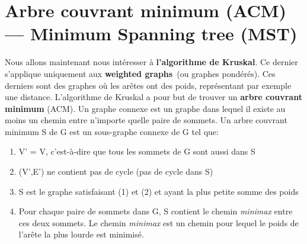 \section{Arbre couvrant minimum (ACM) — Minimum Spanning tree (MST)}
    Nous allons maintenant nous intéresser à \textbf{l'algorithme de Kruskal}. Ce dernier s'applique uniquement aux \textbf{weighted graphs}~(ou graphes pondérés). Ces derniers sont des graphes où les arêtes ont des poids, représentant par exemple une distance. L'algorithme de Kruskal a pour but de trouver un \textbf{arbre couvrant minimum} (ACM). Un graphe connexe est un graphe dans lequel il existe au moins un chemin entre n'importe quelle paire de sommets. Un arbre couvrant minimum S de G est un sous-graphe connexe de G tel que\!:
    \begin{enumerate}
        \item V' = V, c'est-à-dire que tous les sommets de G sont aussi dans S
        \item (V',E') ne contient pas de cycle (pas de cycle dans S)
        \item S est le graphe satisfaisant (1) et (2) et ayant la plus petite somme des poids
        \item Pour chaque paire de sommets dans G, S contient le chemin \textit{minimax} entre ces deux sommets. Le chemin \textit{minimax} est un chemin pour lequel le poids de l'arête la plus lourde est minimisé.
    \end{enumerate}
    
    \textbf{\\}
    
